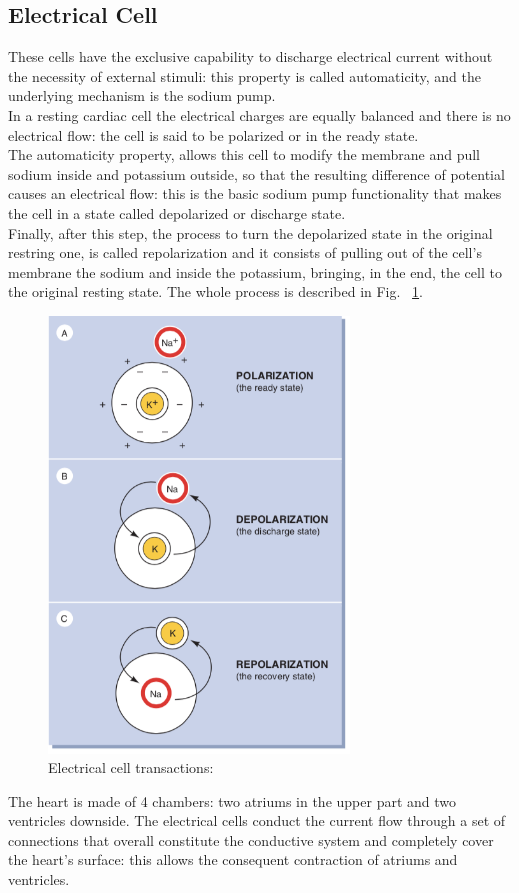 \documentclass[LaM,binding=0.6cm]{sapthesis}
\begin{document}
\subsection{Electrical Cell}
These cells have the exclusive capability to discharge electrical current without the necessity of external stimuli: this property is called automaticity, and the underlying mechanism is the sodium pump.\\In a resting cardiac cell the electrical charges are equally balanced and there is no electrical flow: the cell is said to be polarized or in the ready state.\\The automaticity property, allows this cell to modify the membrane and pull sodium inside and potassium outside, so that the resulting difference of potential causes an electrical flow: this is the basic sodium pump functionality that makes the cell in a state called depolarized or discharge state.\\Finally, after this step, the process to turn the depolarized state in the original restring one, is called repolarization and it consists of pulling out of the cell's membrane the  sodium and inside the potassium, bringing, in the end, the cell to the original resting state. The whole process is described in Fig. ~\ref{fig:ecgtrans}.  
\begin{figure}[H] \centering
    \includegraphics[width=80mm,scale=0.7]{ecgtrans}
    \caption{Electrical cell transactions: \cite{ecgbook}}
    \label{fig:ecgtrans}
\end{figure}
The heart is made of 4 chambers: two atriums in the upper part and two ventricles downside. The electrical cells conduct the current flow through a set of connections that overall constitute the conductive system and completely cover the heart's surface: this allows the consequent contraction of atriums and ventricles.
\end{document}
